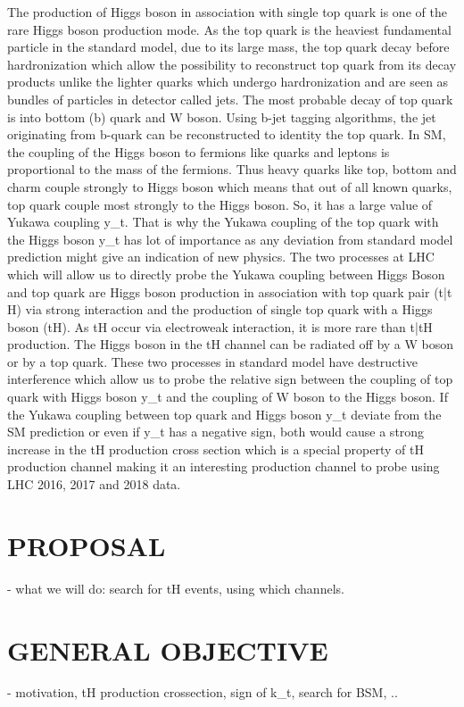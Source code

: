 \documentclass[final,3p]{CSP}
\begin{document}
The production of Higgs boson in association with single top quark is one of the rare Higgs boson production mode. As the top 
quark is the heaviest fundamental particle in the standard model, due to its large mass, the top quark decay before 
hardronization which allow the possibility to reconstruct top quark from its decay products unlike the lighter quarks which 
undergo hardronization and are seen as bundles of particles in detector called jets. The most probable decay of top quark is into 
bottom (b) quark and W boson. Using b-jet tagging algorithms, the jet originating from b-quark can be reconstructed to identity 
the top quark. In SM, the coupling of the Higgs boson to fermions like quarks and leptons is proportional to the mass of the 
fermions. Thus heavy quarks like top, bottom and charm couple strongly to Higgs boson which means that out of all known quarks, 
top quark couple most strongly to the Higgs boson. So, it has a large value of Yukawa coupling y_t. That is why the Yukawa 
coupling of the top quark with the Higgs boson y_t has lot of importance as any deviation from standard model prediction might 
give an indication of new physics. The two processes at LHC which will allow us to directly probe the Yukawa coupling between 
Higgs Boson and top quark are Higgs boson production in association with top quark pair (t\bar{t} H) via strong interaction and 
the production of single top quark with a Higgs boson (tH). As tH occur via electroweak interaction, it is more rare than 
t\bar{t}H production. The Higgs boson in the tH channel can be radiated off by a W boson or by a top quark. These two processes 
in standard model have destructive interference which allow us to probe the relative sign between the coupling of top quark with 
Higgs boson y_t and the coupling of W boson to the Higgs boson. If the Yukawa coupling between top quark and Higgs boson y_t 
deviate from the SM prediction or even if y_t has a negative sign, both would cause a strong increase in the tH production cross 
section which is a special property of tH production channel making it an interesting production channel to probe using LHC 
2016, 2017 and 2018 data.  


\section{PROPOSAL}
- what we will do:  search for tH events, using which channels.

\section{GENERAL OBJECTIVE}
- motivation, tH production crossection, sign of k_t, search for BSM, ..
\end{document}
